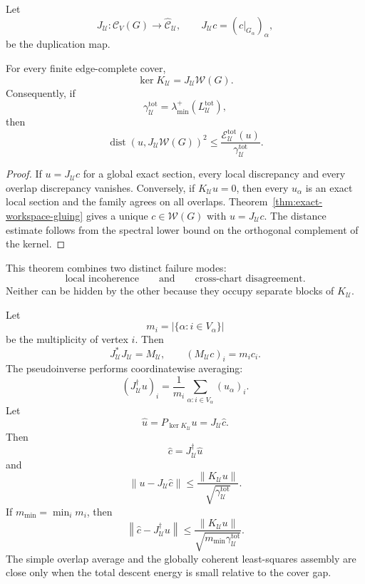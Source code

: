 Let
\[
J_{\mathcal U}:\mathcal C_V(G)\to\widehat{\mathcal C}_{\mathcal U},
\qquad
J_{\mathcal U}c=(c|_{G_\alpha})_\alpha,
\]
be the duplication map.

\begin{theorem}\label{thm:total-descent-kernel}
For every finite edge-complete cover,
\[
\boxed{
\ker K_{\mathcal U}
=
J_{\mathcal U}\mathscr W(G).
}
\]
Consequently, if
\[
\gamma_{\mathcal U}^{\mathrm{tot}}
=
\lambda_{\min}^+
\left(L_{\mathcal U}^{\mathrm{tot}}\right),
\]
then
\[
\boxed{
\operatorname{dist}
\left(
 u,
 J_{\mathcal U}\mathscr W(G)
\right)^2
\leq
\frac{\mathcal E_{\mathcal U}^{\mathrm{tot}}(u)}
{\gamma_{\mathcal U}^{\mathrm{tot}}}.
}
\]
\end{theorem}

\begin{proof}
If \(u=J_{\mathcal U}c\) for a global exact section, every local discrepancy
and every overlap discrepancy vanishes. Conversely, if \(K_{\mathcal U}u=0\),
then every \(u_\alpha\) is an exact local section and the family agrees on all
overlaps. Theorem~\ref{thm:exact-workspace-gluing} gives a unique
\(c\in\mathscr W(G)\) with \(u=J_{\mathcal U}c\). The distance estimate follows
from the spectral lower bound on the orthogonal complement of the kernel.
\end{proof}

This theorem combines two distinct failure modes:
\[
\text{local incoherence}
\qquad\text{and}\qquad
\text{cross-chart disagreement}.
\]
Neither can be hidden by the other because they occupy separate blocks of
\(K_{\mathcal U}\).


Let
\[
m_i=|\{\alpha:i\in V_\alpha\}|
\]
be the multiplicity of vertex \(i\). Then
\[
J_{\mathcal U}^*J_{\mathcal U}=M_{\mathcal U},
\qquad
(M_{\mathcal U}c)_i=m_ic_i.
\]
The pseudoinverse performs coordinatewise averaging:
\[
\boxed{
(J_{\mathcal U}^\dagger u)_i
=
\frac{1}{m_i}
\sum_{\alpha:i\in V_\alpha}(u_\alpha)_i.
}
\]
Let
\[
\widehat u
=
P_{\ker K_{\mathcal U}}u
=
J_{\mathcal U}\widehat c.
\]
Then
\[
\widehat c
=
J_{\mathcal U}^\dagger\widehat u
\]
and
\[
\boxed{
\|u-J_{\mathcal U}\widehat c\|
\leq
\frac{\|K_{\mathcal U}u\|}
{\sqrt{\gamma_{\mathcal U}^{\mathrm{tot}}}}.
}
\]
If \(m_{\min}=\min_i m_i\), then
\[
\boxed{
\left\|
\widehat c-J_{\mathcal U}^\dagger u
\right\|
\leq
\frac{\|K_{\mathcal U}u\|}
{\sqrt{m_{\min}\gamma_{\mathcal U}^{\mathrm{tot}}}}.
}
\]
The simple overlap average and the globally coherent least-squares assembly
are close only when the total descent energy is small relative to the cover
gap.

